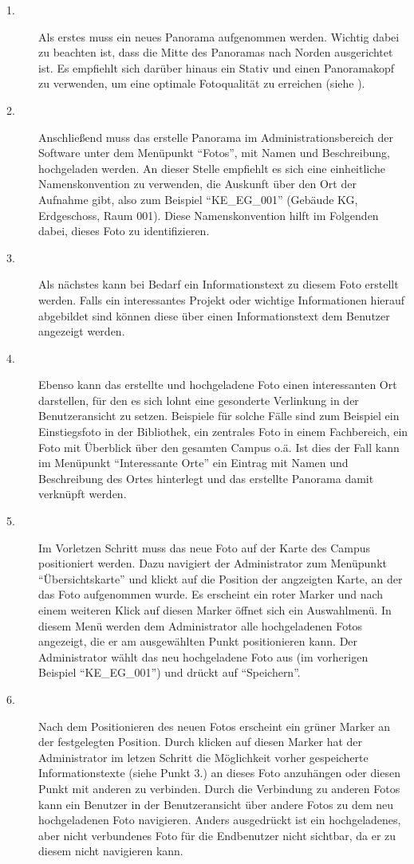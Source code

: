\begin{description}
  \item[1.] Als erstes muss ein neues Panorama aufgenommen werden. Wichtig dabei zu beachten ist, dass die Mitte des Panoramas nach Norden ausgerichtet ist. Es empfiehlt sich darüber hinaus ein Stativ und einen Panoramakopf zu verwenden, um eine optimale Fotoqualität zu erreichen (siehe ).
  \item[2.] Anschließend muss das erstelle Panorama im Administrationsbereich der Software unter dem Menüpunkt "`Fotos"', mit Namen und Beschreibung, hochgeladen werden. An dieser Stelle empfiehlt es sich eine einheitliche Namenskonvention zu verwenden, die Auskunft über den Ort der Aufnahme gibt, also zum Beispiel "`KE\_EG\_001"' (Gebäude KG, Erdgeschoss, Raum 001). Diese Namenskonvention hilft im Folgenden dabei, dieses Foto zu identifizieren.
  \item[3.] Als nächstes kann bei Bedarf ein Informationstext zu diesem Foto erstellt werden. Falls ein interessantes Projekt oder wichtige Informationen hierauf abgebildet sind können diese über einen Informationstext dem Benutzer angezeigt werden.
  \item[4.] Ebenso kann das erstellte und hochgeladene Foto einen interessanten Ort darstellen, für den es sich lohnt eine gesonderte Verlinkung in der Benutzeransicht zu setzen. Beispiele für solche Fälle sind zum Beispiel ein Einstiegsfoto in der Bibliothek, ein zentrales Foto in einem Fachbereich, ein Foto mit Überblick über den gesamten Campus o.ä. Ist dies der Fall kann im Menüpunkt "`Interessante Orte"' ein Eintrag mit Namen und Beschreibung des Ortes hinterlegt und das erstellte Panorama damit verknüpft werden.
  \item[5.] Im Vorletzen Schritt muss das neue Foto auf der Karte des Campus positioniert werden. Dazu navigiert der Administrator zum Menüpunkt "`Übersichtskarte"' und klickt auf die Position der angzeigten Karte, an der das Foto aufgenommen wurde. Es erscheint ein roter Marker und nach einem weiteren Klick auf diesen Marker öffnet sich ein Auswahlmenü. In diesem Menü werden dem Administrator alle hochgeladenen Fotos angezeigt, die er am ausgewählten Punkt positionieren kann. Der Administrator wählt das neu hochgeladene Foto aus (im vorherigen Beispiel "`KE\_EG\_001"') und drückt auf "`Speichern"'.
  \item[6.] Nach dem Positionieren des neuen Fotos erscheint ein grüner Marker an der festgelegten Position. Durch klicken auf diesen Marker hat der Administrator im letzen Schritt die Möglichkeit vorher gespeicherte Informationstexte (siehe Punkt 3.) an dieses Foto anzuhängen oder diesen Punkt mit anderen zu verbinden. Durch die Verbindung zu anderen Fotos kann ein Benutzer in der Benutzeransicht über andere Fotos zu dem neu hochgeladenen Foto navigieren. Anders ausgedrückt ist ein hochgeladenes, aber nicht verbundenes Foto für die Endbenutzer nicht sichtbar, da er zu diesem nicht navigieren kann.
\end{description}